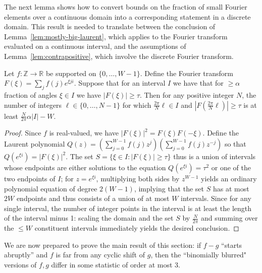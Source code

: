 \documentclass[11pt]{article}
\theoremstyle{plain}
\begin{document}
The next lemma shows how to convert bounds on the fraction of small Fourier elements over a continuous domain into a corresponding statement in a discrete domain. This result is needed to translate between the conclusion of Lemma~\ref{lem:mostly-big-laurent}, which applies to the Fourier transform evaluated on a continuous interval, and the assumptions of Lemma~\ref{lem:contrapositive}, which involve the discrete Fourier transform.

\begin{lemma}\label{lem:fourier-continuous-to-discrete}
Let $f:\mathbb{Z}\rightarrow \mathbb{R}$ be supported on $\{0,\ldots,W-1\}$. Define the Fourier transform $F(\xi)=\sum_j f(j) e^{\xi j i}$. Suppose that for an interval $I$ we have that for $\geq \alpha$ fraction of angles $\xi\in I$ we have $|F(\xi)|\geq \tau$. Then for any positive integer $N$, the number of integers $\ell\in\{0,\ldots,N-1\}$ for which $\frac{2\pi}{N} \ell\in I$ and $|F(\frac{2\pi}{N} \ell)|\geq \tau$ is at least $\frac{N}{2\pi}\alpha|I|-W$.
\end{lemma}
\begin{proof}
Since $f$ is real-valued, we have $|F(\xi)|^2=F(\xi)F(-\xi)$. Define the Laurent polynomial $Q(z)=(\sum_{j=0}^{W-1} f(j) z^j)(\sum_{j=0}^{W-1} f(j) z^{-j})$ so that $Q(e^{\xi i})=|F(\xi)|^2$. The set $S=\{\xi\in I:|F(\xi)|\geq \tau\}$ thus is a union of intervals whose endpoints are either solutions to the equation $Q(e^{\xi i})=\tau^2$ or one of the two endpoints of $I$; for $z=e^{\xi i}$, multiplying both sides by $z^{W-1}$ yields an ordinary polynomial equation of degree $2(W-1)$, implying that the set $S$ has at most $2W$ endpoints and thus consists of a union of at most $W$ intervals. Since for any single interval, the number of integer points in the interval is at least the length of the interval minus 1: scaling the domain and the set $S$ by $\frac{N}{2\pi}$ and summing over the $\leq W$ constituent intervals immediately yields the desired conclusion.
\end{proof}

We are now prepared to prove the main result of this section: if $f-g$ ``starts abruptly'' and $f$ is far from any cyclic shift of $g$, then the ``binomially blurred" versions of $f,g$ differ in some statistic of order at most $3$.
\end{document}
